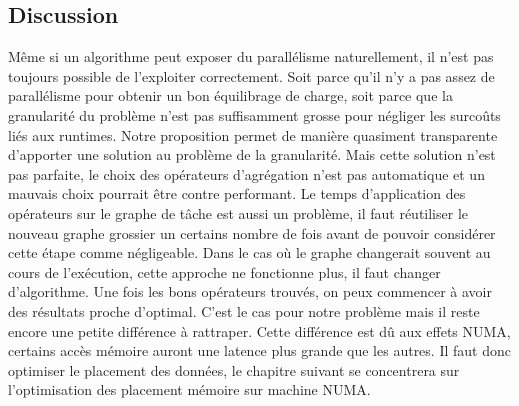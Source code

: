 \subsection{Discussion}
Même si un algorithme peut exposer du parallélisme naturellement, il n'est pas toujours possible de l'exploiter correctement.
%
Soit parce qu'il n'y a pas assez de parallélisme pour obtenir un bon équilibrage de charge, soit parce que la granularité du problème n'est pas suffisamment grosse pour négliger les surcoûts liés aux runtimes.
%
Notre proposition permet de manière quasiment transparente d'apporter une solution au problème de la granularité.
%
Mais cette solution n'est pas parfaite, le choix des opérateurs d'agrégation n'est pas automatique et un mauvais choix pourrait être contre performant.
%
Le temps d'application des opérateurs sur le graphe de tâche est aussi un problème, il faut réutiliser le nouveau graphe grossier un certains nombre de fois avant de pouvoir considérer cette étape comme négligeable.
%
Dans le cas où le graphe changerait souvent au cours de l'exécution, cette approche ne fonctionne plus, il faut changer d'algorithme.
%
Une fois les bons opérateurs trouvés, on peux commencer à avoir des résultats proche d'optimal.
%
C'est le cas pour notre problème mais il reste encore une petite différence à rattraper.
%
Cette différence est dû aux effets NUMA, certains accès mémoire auront une latence plus grande que les autres.
%
Il faut donc optimiser le placement des données, le chapitre suivant se concentrera sur l'optimisation des placement mémoire sur machine NUMA.
